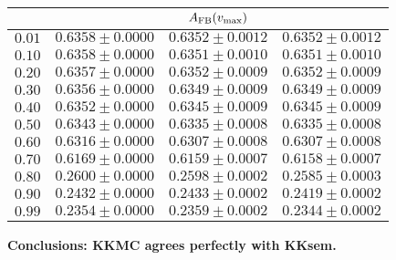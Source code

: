 \documentclass[12pt,dvips]{article}
\begin{document}
\begin{tabular}                                                                                          {||c|c|c|c||}
\\
\hline
& \multicolumn{ 3}{c||}{
     {\color{red}$A_{\rm FB}(v_{\max})$}                                              }
\\
\hline
$      0.01$ & $    0.6358\pm  0.0000$ & $    0.6352\pm  0.0012$ & $    0.6352\pm  0.0012$
\\
\hline
$      0.10$ & $    0.6358\pm  0.0000$ & $    0.6351\pm  0.0010$ & $    0.6351\pm  0.0010$
\\
$      0.20$ & $    0.6357\pm  0.0000$ & $    0.6352\pm  0.0009$ & $    0.6352\pm  0.0009$
\\
$      0.30$ & $    0.6356\pm  0.0000$ & $    0.6349\pm  0.0009$ & $    0.6349\pm  0.0009$
\\
$      0.40$ & $    0.6352\pm  0.0000$ & $    0.6345\pm  0.0009$ & $    0.6345\pm  0.0009$
\\
$      0.50$ & $    0.6343\pm  0.0000$ & $    0.6335\pm  0.0008$ & $    0.6335\pm  0.0008$
\\
$      0.60$ & $    0.6316\pm  0.0000$ & $    0.6307\pm  0.0008$ & $    0.6307\pm  0.0008$
\\
$      0.70$ & $    0.6169\pm  0.0000$ & $    0.6159\pm  0.0007$ & $    0.6158\pm  0.0007$
\\
$      0.80$ & $    0.2600\pm  0.0000$ & $    0.2598\pm  0.0002$ & $    0.2585\pm  0.0003$
\\
$      0.90$ & $    0.2432\pm  0.0000$ & $    0.2433\pm  0.0002$ & $    0.2419\pm  0.0002$
\\
\hline
$      0.99$ & $    0.2354\pm  0.0000$ & $    0.2359\pm  0.0002$ & $    0.2344\pm  0.0002$
\\
\hline\hline
\end{tabular}

\vspace{10mm}
\noindent
{\Large\bf\color{red}
Conclusions: {\cal KK}MC agrees perfectly with {\cal KK}sem.}
\end{document}
